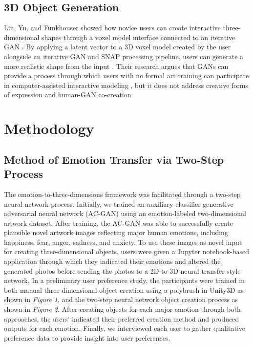 \documentclass{sigchi}
\begin{document}
\subsection{3D Object Generation}
Liu, Yu, and Funkhouser showed how novice users can create interactive three-dimensional shapes through a voxel model interface connected to an iterative GAN \cite{Liu_2017}. By applying a latent vector to a 3D voxel model created by the user alongside an iterative GAN and SNAP processing pipeline, users can generate a more realistic shape from the input \cite{Liu_2017}. Their research argues that GANs can provide a process through which users with no formal art training can participate in computer-assisted interactive modeling \cite{Liu_2017}, but it does not address creative forms of expression and human-GAN co-creation. 

\section{Methodology}

\subsection{Method of Emotion Transfer via Two-Step Process}
The emotion-to-three-dimensions framework was facilitated through a two-step neural network process. Initially, we trained an auxiliary classifier generative adversarial neural network (AC-GAN) using an emotion-labeled two-dimensional artwork dataset. After training, the AC-GAN was able to successfully create plausible novel artwork images reflecting major human emotions, including happiness, fear, anger, sadness, and anxiety. To use these images as novel input for creating three-dimensional objects, users were given a Jupyter notebook-based application through which they indicated their emotions and altered the generated photos before sending the photos to a 2D-to-3D neural transfer style network. In a preliminary user preference study, the participants were trained in both manual three-dimensional object creation using a polybrush in Unity3D as shown in \emph{Figure 1}, and the two-step neural network object creation process as shown in \emph{Figure 2}. After creating objects for each major emotion through both approaches, the users’ indicated their preferred creation method and produced outputs for each emotion. Finally, we interviewed each user to gather qualitative preference data to provide insight into user preferences. 
\end{document}
